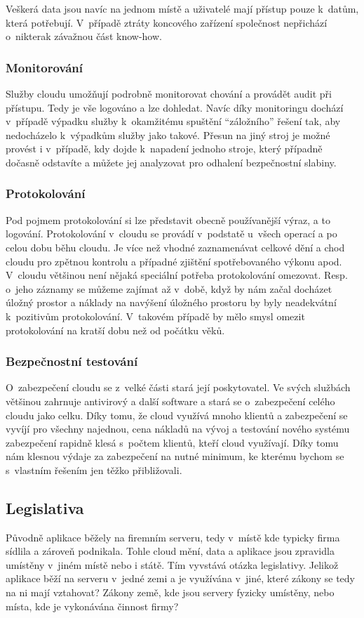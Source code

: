 Veškerá data jsou navíc na jednom místě a uživatelé mají přístup pouze k~datům, která potřebují. V~případě ztráty koncového zařízení společnost nepřichází o~nikterak závažnou část know-how.

\subsubsection{Monitorování}
Služby cloudu umožňují podrobně monitorovat chování a provádět audit při přístupu. Tedy je vše logováno a lze dohledat. Navíc díky monitoringu dochází v~případě výpadku služby k~okamžitému spuštění "`záložního"' řešení tak, aby nedocházelo k~výpadkům služby jako takové. Přesun na jiný stroj je možné provést i v~případě, kdy dojde k~napadení jednoho stroje, který případně dočasně odstavíte a můžete jej analyzovat pro odhalení bezpečnostní slabiny.

\subsubsection{Protokolování}
Pod pojmem protokolování si lze představit obecně používanější výraz, a to logování. Protokolování v~cloudu se provádí v~podstatě u~všech operací a po celou dobu běhu cloudu. Je více než vhodné zaznamenávat celkové dění a chod cloudu pro zpětnou kontrolu a případné zjištění spotřebovaného výkonu apod. V~cloudu většinou není nějaká speciální potřeba protokolování omezovat. Resp. o~jeho záznamy se můžeme zajímat až v~době, když by nám začal docházet úložný prostor a náklady na navýšení úložného prostoru by byly neadekvátní k~pozitivům protokolování. V~takovém případě by mělo smysl omezit protokolování na kratší dobu než od počátku věků.

\subsubsection{Bezpečnostní testování}
O~zabezpečení cloudu se z~velké části stará její poskytovatel. Ve svých službách většinou zahrnuje antivirový a další software a stará se o~zabezpečení celého cloudu jako celku. Díky tomu, že cloud využívá mnoho klientů a zabezpečení se vyvíjí pro všechny najednou, cena nákladů na vývoj a testování nového systému zabezpečení rapidně klesá s~počtem klientů, kteří cloud využívají. Díky tomu nám klesnou výdaje za zabezpečení na nutné minimum, ke kterému bychom se s~vlastním řešením jen těžko přibližovali.

\subsection{Legislativa}
Původně aplikace běžely na firemním serveru, tedy v~místě kde typicky firma sídlila a zároveň podnikala. Tohle cloud mění, data a aplikace jsou zpravidla umístěny v~jiném místě nebo i státě. Tím vyvstává otázka legislativy. Jelikož aplikace běží na serveru v~jedné zemi a je využívána v~jiné, které zákony se tedy na ni mají vztahovat? Zákony země, kde jsou servery fyzicky umístěny, nebo místa, kde je vykonávána činnost firmy?

